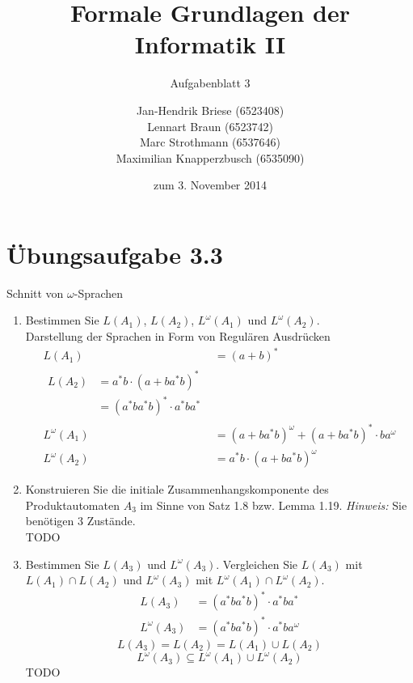 \documentclass[a4paper]{scrartcl}
\title{Formale Grundlagen der Informatik II}
\subtitle{Aufgabenblatt 3}
\author{
    Jan-Hendrik Briese (6523408) \\
    Lennart Braun (6523742) \\
    Marc Strothmann (6537646) \\
    Maximilian Knapperzbusch (6535090)
}
\date{zum 3. November 2014}
\begin{document}
\maketitle

\section*{Übungsaufgabe 3.3} 
Schnitt von $\omega$-Sprachen
\begin{enumerate}[1.]
    \item Bestimmen Sie $L(A_1)$, $L(A_2)$, $L^{\omega}(A_1)$ und $L^{\omega}(A_2)$. \\
        Darstellung der Sprachen in Form von Regulären Ausdrücken
        \begin{align*}
            L(A_1) &= \left( a + b \right)^* \\
            \begin{split}
                L(A_2) &= a^*b \cdot \left( a + ba^*b \right)^* \\
                &= \left( a^*ba^*b \right)^* \cdot a^*ba^*
            \end{split} \\
            L^\omega(A_1) &= \left( a + ba^*b \right)^\omega + \left( a + ba^*b \right)^* \cdot b a^\omega \\
            L^\omega(A_2) &= a^* b \cdot \left( a + ba^*b \right)^\omega
        \end{align*}

    \item Konstruieren Sie die initiale Zusammenhangskomponente des Produktautomaten 
        $A_3$ im Sinne von Satz 1.8 bzw. Lemma 1.19. \textit{Hinweis:} Sie benötigen 
        3 Zustände. \\
        TODO

    \item Bestimmen Sie $L(A_3)$ und $L^{\omega}(A_3)$. Vergleichen Sie $L(A_3)$ mit 
        $L(A_1) \cap L(A_2)$ und $L^{\omega}(A_3)$ mit $L^{\omega}(A_1) \cap L^{\omega}(A_2)$. \\
        \begin{align*}
            L(A_3) &= \left( a^*ba^*b \right)^* \cdot a^*ba^* \\
            L^\omega(A_3) &= \left( a^*ba^*b \right)^* \cdot a^*ba^\omega
        \end{align*}
        \begin{equation}
            L(A_3) = L(A_2) = L(A_1) \cup L(A_2)
        \end{equation}
        \begin{equation}
            L^\omega(A_3) \subseteq L^\omega(A_1) \cup L^\omega(A_2)
        \end{equation}
        TODO


\end{enumerate}
\end{document}
